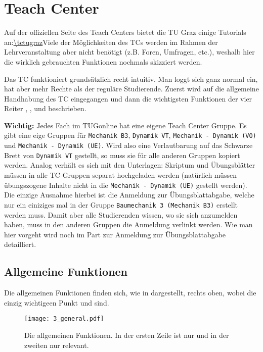 \chapter{Teach Center}

Auf der offiziellen Seite des Teach Centers bietet die TU Graz einige Tutorials 
an:\linebreak\url{\tctugraz}\linebreak Viele der Möglichkeiten des TCs
werden im Rahmen der Lehrveranstaltung aber nicht benötigt (z.B. Foren,
Umfragen, etc.), weshalb hier die wirklich gebrauchten Funktionen nochmals
skizziert werden.

Das TC funktioniert grundsätzlich recht intuitiv. Man loggt sich ganz normal 
ein, hat aber mehr Rechte als der reguläre Studierende. Zuerst wird auf die
allgemeine Handhabung des TC eingegangen und dann die wichtigsten Funktionen 
der vier Reiter , , 
 und  beschrieben.

{\bf Wichtig:} Jedes Fach im TUGonline hat eine eigene Teach Center Gruppe. 
Es gibt eine eige Gruppen für {\tt Mechanik B3}, 
{\tt Dynamik VT}, {\tt Mechanik - Dynamik (VO)} und 
{\tt Mechanik - Dynamik (UE)}. Wird also eine Verlautbarung auf das Schwarze
Brett von {\tt Dynamik VT} gestellt, so muss sie für alle anderen Gruppen
kopiert werden. Analog verhält es sich mit den Unterlagen: Skriptum und
Übungsblätter müssen in alle TC-Gruppen separat hochgeladen werden (natürlich
müssen übungszogene Inhalte nicht in die {\tt Mechanik - Dynamik (UE)}
gestellt werden). Die einzige Ausnahme hierbei ist die Anmeldung zur
Übungsblattabgabe, welche nur ein einiziges mal in der Gruppe 
{\tt Baumechanik 3 (Mechanik B3)} erstellt werden muss. Damit aber alle
Studierenden wissen, wo sie sich anzumelden haben, muss in den anderen Gruppen
die Anmeldung verlinkt werden. Wie man hier vorgeht wird noch im Part zur
Anmeldung zur Übungsblattabgabe detailliert.

\section{Allgemeine Funktionen}

Die allgemeinen Funktionen finden sich, wie in  dargestellt,
rechts oben, wobei die einzig wichtigeen Punkt  und
 sind.

\begin{figure}[htbp]
\begin{center}
  \texttt{[image: 3\_general.pdf]}
  \caption{ Die allgemeinen Funktionen. In der ersten Zeile ist nur 
     und in der zweiten nur  relevant.}
  \label{fig:general}
\end{center}
\end{figure}

